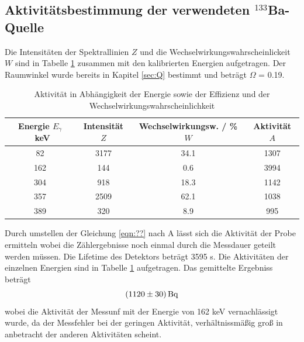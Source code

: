 \subsection{Aktivitätsbestimmung der verwendeten $^{133}$Ba-Quelle}
Die Intensitäten der Spektrallinien $Z$ und die Wechselwirkungswahrscheinlickeit $W$ sind in Tabelle \ref{tab:Ba} zusammen mit den kalibrierten Energien aufgetragen. Der Raumwinkel wurde bereits in Kapitel \ref{sec:Q} bestimmt und beträgt $\Omega$ = 0.19.
\begin{table}
  \centering
  \caption{Aktivität in Abhängigkeit der Energie sowie der Effizienz und der Wechselwirkungswahrscheinlichkeit}
  \begin{tabular}{c c c c}
    \toprule
	Energie $E_\gamma$ \ keV & Intensität $Z$ & Wechselwirkungsw. / \% $W$ & Aktivität $A$ \\
    \hline
	82	& 3177	& 34.1	& 1307	\\
	162	& 144	& 0.6	& 3994	\\
	304	& 918	& 18.3	& 1142	\\
	357	& 2509	& 62.1	& 1038	\\
	389	& 320	& 8.9	& 995	\\
    \bottomrule
  \end{tabular}
  \label{tab:Ba}
\end{table}
Durch umstellen der Gleichung \ref{eqn:??} nach A lässt sich die Aktivität der Probe ermitteln wobei die Zählergebnisse noch einmal durch die Messdauer geteilt werden müssen. Die Lifetime des Detektors beträgt 3595 s. Die Aktivitäten der einzelnen Energien sind in Tabelle \ref{tab:Ba} aufgetragen. Das gemittelte Ergebniss beträgt 
\begin{equation}
  (\num{1120 +- 30}) \, \text{Bq}
  \label{eqn:aktBq}
\end{equation}
wobei die Aktivität der Messunf mit der Energie von 162 keV vernachlässigt wurde, da der Messfehler bei der geringen Aktivität, verhältnissmäßig groß in anbetracht der anderen Aktivitäten scheint.
